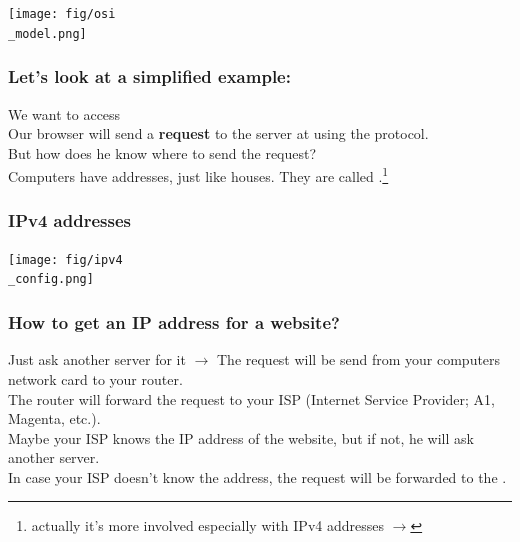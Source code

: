 \documentclass{beamer}
\begin{document}
\begin{frame}
  \begin{center}
    \texttt{[image: fig/osi\\\_model.png]}
  \end{center}
  \vspace{-6mm}
\end{frame}
\begin{frame}
  \frametitle{Let's look at a simplified example:}
  We want to access \texttt{}\\
  \vspace{5mm}
  Our browser will send a \textbf{request} to the server at \texttt{} using the \textbf{} protocol.\\
  \vspace{5mm}
  But how does he know where to send the request?\\
  \vspace{5mm}
  Computers have addresses, just like houses. They are called \textbf{}.\footnote[frame]{\tiny actually it's more involved especially with IPv4 addresses $\rightarrow$ }\\ %
\end{frame}
\begin{frame}
  \frametitle{IPv4 addresses}
  \begin{center}
    \texttt{[image: fig/ipv4\\\_config.png]}
  \end{center}
  \vspace{-6mm}
\end{frame}
\begin{frame}
  \frametitle{How to get an IP address for a website?}
  Just ask another server for it $\rightarrow$ \textbf{}
  \vspace{5mm}
  The request will be send from your computers network card to your router.\\ The router will forward the request to your ISP (Internet Service Provider; A1, Magenta, etc.).\\
  Maybe your ISP knows the IP address of the website, but if not, he will ask another server.\\
  \vspace{5mm}
  In case your ISP doesn't know the address, the request will be forwarded to the \textbf{}.\\
\end{frame}
\end{document}
